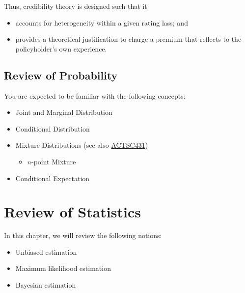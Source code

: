 \documentclass[notoc,notitlepage]{tufte-book}
\begin{document}
Thus, credibility theory is designed such that it
\begin{itemize}
  \item accounts for heterogeneity within a given rating lass; and
  \item provides a theoretical justification to charge a premium that reflects
    to the policyholder's own experience.
\end{itemize}


\section{Review of Probability}%
\label{sec:review_of_probability}

You are expected to be familiar with the following concepts:

\begin{itemize}
  \item Joint and Marginal Distribution
  \item Conditional Distribution
  \item Mixture Distributions (see also
    \href{https://tex.japorized.ink/ACTSC431/classnotes.pdf}{ACTSC431})
    \begin{itemize}
      \item $n$-point Mixture
    \end{itemize}
  \item Conditional Expectation
\end{itemize}



\chapter{Review of Statistics}%
\label{chp:review_of_statistics}

In this chapter, we will review the following notions:
\begin{itemize}
  \item Unbiased estimation
  \item Maximum likelihood estimation
  \item Bayesian estimation \faStar
\end{itemize}
\end{document}
